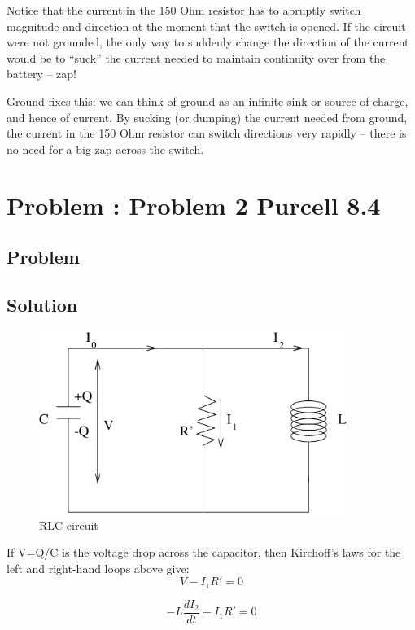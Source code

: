\documentclass[solutions]{esg8022pset}
\begin{document}
Notice that the current in the 150 Ohm resistor has to abruptly switch
magnitude and direction at the moment that the switch is opened. If
the circuit were not grounded, the only way to suddenly change the
direction of the current would be to ``suck'' the current needed to
maintain continuity over from the battery -- zap!

Ground fixes this: we can think of ground as an infinite sink or
source of charge, and hence of current. By sucking (or dumping) the
current needed from ground, the current in the 150 Ohm resistor can
switch directions very rapidly -- there is no need for a big zap
across the switch.


\section{Problem \thesection: Problem 2 Purcell 8.4}
\subsection{Problem}
\subsection{Solution}

\begin{figure}[H]
    \centering
    \includegraphics[width = 10cm]{ps8}
    \caption{RLC circuit}
    \label{fig:graph22.eps}
  \end{figure}


If V=Q/C is the voltage drop across the capacitor, then Kirchoff's
laws for the left and right-hand loops above give:
\begin{equation}
V-I_1R'=0
\end{equation}

\begin{equation}
-L\frac{dI_2}{dt}+I_1R'=0
\end{equation}
\end{document}

